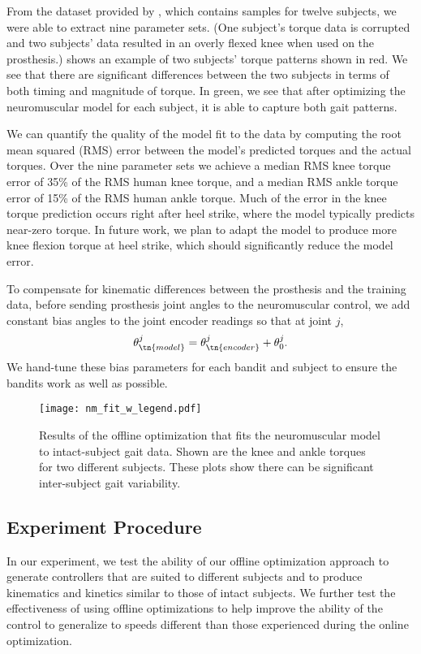 From the dataset provided by \citet{moore2015elaborate}, which contains samples
for twelve subjects, we were able to extract nine parameter sets. (One subject's
torque data is corrupted and two subjects' data resulted in an overly flexed
knee when used on the prosthesis.)  shows an example of two
subjects' torque patterns shown in red. We see that there are significant
differences between the two subjects in terms of both timing and magnitude of
torque. In green, we see that after optimizing the neuromuscular model for each
subject, it is able to capture both gait patterns. 

We can quantify the quality of the model fit to the data by computing the root
mean squared (RMS) error between the model's predicted torques and the actual
torques. Over the nine parameter sets we achieve a median RMS knee torque error
of 35\% of the RMS human knee torque, and a median RMS ankle torque error of
15\% of the RMS human ankle torque. Much of the error in the knee torque
prediction occurs right after heel strike, where the model typically predicts
near-zero torque. In future work, we plan to adapt the model to produce more
knee flexion torque at heel strike, which should significantly reduce the model
error.

To compensate for kinematic differences between the prosthesis and the training
data, before sending prosthesis joint angles to the neuromuscular control, we
add constant bias angles to the joint encoder readings so that at joint $j$,
\begin{align}
    \theta_\tn{model}^j = \theta_\tn{encoder}^j + \theta_0^j.
    \label{eq:bias_param}
\end{align}
We hand-tune these bias parameters for each bandit and subject to ensure the
bandits work as well as possible.
 
\begin{figure}[htb]
    \centering 
    \texttt{[image: nm\_fit\_w\_legend.pdf]}
    \caption[Results of offline optimization to fits neuromuscular model to
    intact-subject gait data at different speeds]{Results of the offline
    optimization that fits the neuromuscular model to intact-subject gait data.
    Shown are the knee and ankle torques for two different subjects.  These
    plots show there can be significant inter-subject gait
    variability.}\label{fig:nm_fit}
\end{figure}

\subsection{Experiment Procedure}
In our experiment, we test the ability of our offline optimization approach to
generate controllers that are suited to different subjects and to produce
kinematics and kinetics similar to those of intact subjects. We further test the
effectiveness of using offline optimizations to help improve the ability of the
control to generalize to speeds different than those experienced during the
online optimization.

